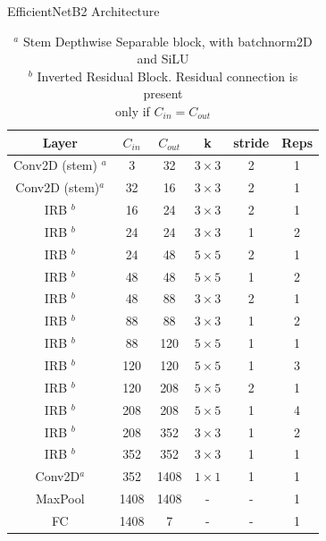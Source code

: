 \begin{table}[H]
   \centering
   \caption{EfficientNetB2 Architecture} \label{EfficientNetb2_arch}
   \begin{tabular}{cccccc}
   \hline
   Layer & $C_{in}$ & $C_{out}$ & k & stride & Reps \\
   \hline
   Conv2D (stem) $^a$ & 3 & 32 &$3\times3$& 2 & 1 \\
   \hline
   Conv2D (stem)$^a$ & 32 & 16 & $3\times3$& 2 & 1 \\
   \hline
   IRB $^b$ & 16 & 24 & $3\times3$& 2 & 1 \\
   \hline
   IRB $^b$ & 24 & 24 & $3\times3$& 1 & 2 \\
   \hline
   IRB $^b$ & 24 & 48 & $5\times5$& 2 & 1 \\
   \hline
   IRB $^b$ & 48 & 48 & $5\times5$& 1 & 2 \\
   \hline
   IRB $^b$ & 48 & 88 & $3\times3$& 2 & 1 \\
   \hline
   IRB $^b$ & 88 & 88 & $3\times3$& 1 & 2 \\
   \hline
   IRB $^b$ & 88 & 120 & $5\times5$& 1 & 1 \\
   \hline
   IRB $^b$ & 120 & 120 & $5\times5$& 1 & 3 \\
   \hline
   IRB $^b$ & 120 & 208 & $5\times5$& 2 & 1 \\
   \hline
   IRB $^b$ & 208 & 208 & $5\times5$& 1 & 4 \\
   \hline
   IRB $^b$ & 208 & 352 & $3\times3$& 1 & 2 \\
   \hline
   IRB $^b$ & 352 & 352 & $3\times3$& 1 & 1 \\
   \hline
   Conv2D$^a$ & 352 & 1408 & $1\times1$& 1 & 1 \\
   \hline
   MaxPool & 1408 & 1408 & -& - & 1 \\
   \hline
   FC & 1408 & 7 & -& - & 1 \\
   \hline
   \end{tabular}
   \begin{minipage}{\textwidth}
       \begin{adjustwidth}{0cm}{5cm}
       \caption*{\footnotesize{$^a$ Stem Depthwise Separable block, with batchnorm2D\\
    and SiLU \vspace{0.1cm}\\
       $^b$ Inverted Residual Block. Residual connection is present \\ 
       only if $C_{in}=C_{out}$
       }}
       \end{adjustwidth}
   \end{minipage}
\end{table}


